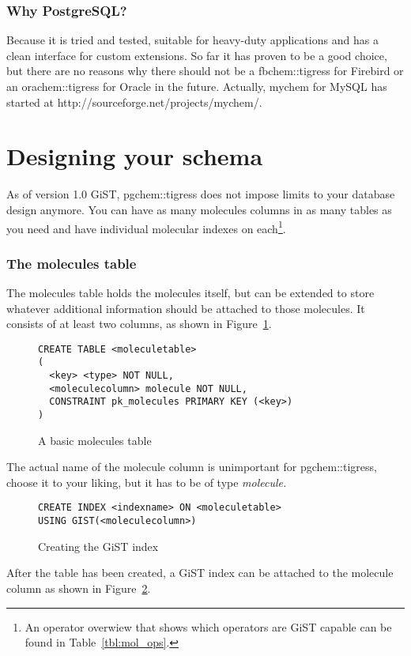 \documentclass[a4paper]{article}
\begin{document}
\section{Why PostgreSQL?}
Because it is tried and tested, suitable for heavy-duty applications and has a clean interface for custom extensions. So far it has proven to be a good choice, but there are no reasons why there should not be a fbchem::tigress for Firebird or an orachem::tigress for Oracle in the future. Actually, mychem for MySQL has started at http://sourceforge.net/projects/mychem/.
\part{Designing your schema}
As of version 1.0 GiST, pgchem::tigress does not impose limits to your database design anymore. You can have as many molecules columns in as many tables as you need and have individual molecular indexes on each\footnote{An operator overwiew that shows which operators are GiST capable can be found in Table~\ref{tbl:mol_ops}.}.
\section{The molecules table}
The molecules table holds the molecules itself, but can be extended to store whatever additional information should be attached to those molecules. It consists of at least two columns, as shown in Figure~\ref{fig:basic_mol_table}.

\begin{figure}[tb]
\begin{verbatim}
CREATE TABLE <moleculetable>
(
  <key> <type> NOT NULL,
  <moleculecolumn> molecule NOT NULL,
  CONSTRAINT pk_molecules PRIMARY KEY (<key>)
) 
\end{verbatim}
\caption{A basic molecules table}
	\label{fig:basic_mol_table}
\end{figure}
The actual name of the molecule column is unimportant for pgchem::tigress, choose it to your liking, but it has to be of type \itshape molecule\normalfont.
\begin{figure}[tb]
\begin{verbatim}
CREATE INDEX <indexname> ON <moleculetable>
USING GIST(<moleculecolumn>)
\end{verbatim}
\caption{Creating the GiST index}
	\label{fig:crea_gist}
\end{figure}
After the table has been created, a GiST index can be attached to the molecule column as shown in Figure~\ref{fig:crea_gist}.
\end{document}
